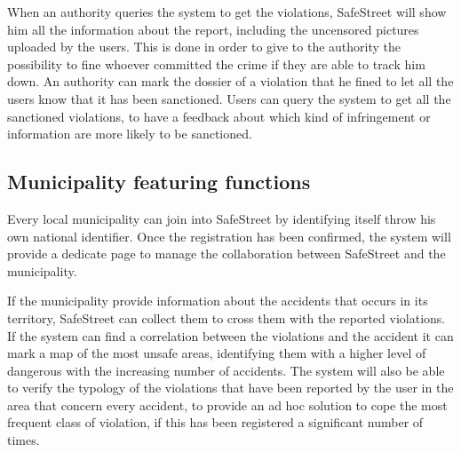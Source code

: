 \documentclass[../RASD.tex]{subfiles}
\begin{document}
    When an authority queries the system to get the violations, SafeStreet will show him all the information about the report, including the uncensored pictures uploaded by the users. This is done in order to give to the authority the possibility to fine whoever committed the crime if they are able to track him down. An authority can mark the dossier of a violation that he fined to let all the users know that it has been sanctioned. Users can query the system to get all the sanctioned violations, to have a feedback about which kind of infringement or information are more likely to be sanctioned.
    \subsection{Municipality featuring functions}\label{subsec:municipality-featuring-functions}
    Every local municipality can join into SafeStreet by identifying itself throw his own national identifier. Once the registration has been confirmed, the system will provide a dedicate page to manage the collaboration between SafeStreet and the municipality.

    If the municipality provide information about the accidents that occurs in its territory, SafeStreet can collect them to cross them with the reported violations. If the system can find a correlation between the violations and the accident it can mark a map of the most unsafe areas, identifying them with a higher level of dangerous with the increasing number of accidents. The system will also be able to verify the typology of the violations that have been reported by the user in the area that concern every accident, to provide an ad hoc solution to cope the most frequent class of violation, if this has been registered a significant number of times.
\end{document}
